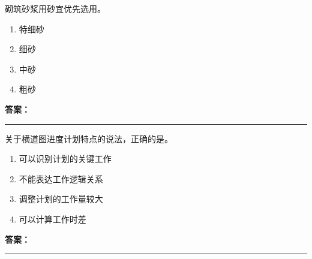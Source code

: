 \documentclass[UTF8,fontset=fandol,11pt]{ctexart}
\newcommand{\answerline}{\textcolor{answerred}{\rule{2.4cm}{0.7pt}}}
\begin{document}
\begin{quizbox}[title={乱序第 71 题｜第六章砌筑工程}]

砌筑砂浆用砂宜优先选用。\\

\begin{enumerate}[label=\Alph*.]

\item 特细砂

\item 细砂

\item 中砂

\item 粗砂

\end{enumerate}

\textbf{\textcolor{answerred}{答案：}} \answerline

\end{quizbox}

\vspace{0.2em}

\begin{quizbox}[title={乱序第 72 题｜第十章流水施工原理}]

关于横道图进度计划特点的说法，正确的是。\\

\begin{enumerate}[label=\Alph*.]

\item 可以识别计划的关键工作

\item 不能表达工作逻辑关系

\item 调整计划的工作量较大

\item 可以计算工作时差

\end{enumerate}

\textbf{\textcolor{answerred}{答案：}} \answerline

\end{quizbox}

\vspace{0.2em}
\end{document}
